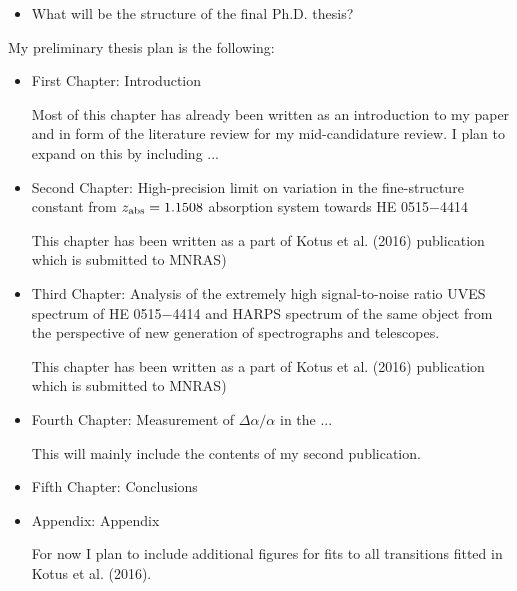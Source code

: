 \documentclass[useAMS,usenatbib,onecolumn]{mnras}
\newcommand{\zab}{\ensuremath{z_\text{\scriptsize abs}}}
\newcommand{\varal}{\ensuremath{\Delta \alpha/\alpha}}
\begin{document}
\begin{itemize}
  \item{What will be the structure of the final Ph.D. thesis?\\}
\end{itemize}

  My preliminary thesis plan is the following:
  \begin{itemize}
    \item{First Chapter: } Introduction 
    
    Most of this chapter has already been written as an introduction to my paper and in form of the literature review for my mid-candidature review. I plan to expand on this by including ...
    \item{Second Chapter:} High-precision limit on variation in the fine-structure constant from $\zab=1.1508$ absorption system towards HE 0515$-$4414 
    
    This chapter has been written as a part of Kotus et al. (2016) publication which is submitted to MNRAS) 
    \item{Third Chapter:} Analysis of the extremely high signal-to-noise ratio UVES spectrum of HE 0515$-$4414 and HARPS spectrum of the same object from the perspective of new generation of spectrographs and telescopes. 
    
    This chapter has been written as a part of Kotus et al. (2016) publication which is submitted to MNRAS)
    \item{Fourth Chapter:} Measurement of $\varal$ in the ...
    
    This will mainly include the contents of my second publication.
    \item{Fifth Chapter:} Conclusions
    
    
    \item{Appendix:} Appendix
    
    For now I plan to include additional figures for fits to all transitions fitted in Kotus et al. (2016).
    
  \end{itemize}


\end{document}
